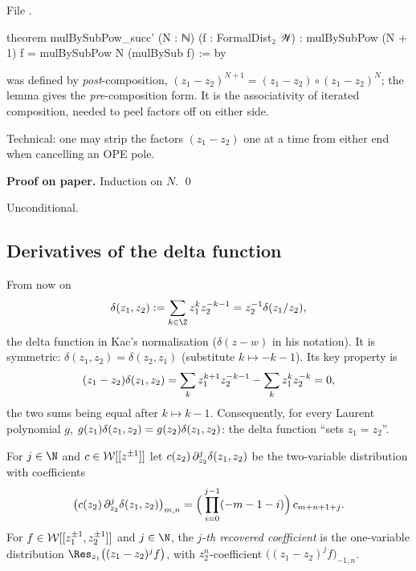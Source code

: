 \noindent File .
\begin{leancode}
theorem mulBySubPow_succ' (N : ℕ) (f : FormalDist₂ 𝒲) :
    mulBySubPow (N + 1) f = mulBySubPow N (mulBySub f) := by
\end{leancode}

\begin{dictionary}
 was defined by \emph{post}-composition, $(z_1-z_2)^{N+1} = (z_1-z_2)\circ(z_1-z_2)^N$; the
lemma gives the \emph{pre}-composition form. It is the associativity of iterated composition, needed to
peel factors off on either side.
\end{dictionary}

\begin{physics}
Technical: one may strip the factors $(z_1-z_2)$ one at a time from either end when cancelling an OPE
pole.
\end{physics}

\textbf{Proof on paper.} Induction on $N$. \qed

\begin{status}
Unconditional.
\end{status}

\subsection{Derivatives of the delta function}

From now on
\begin{equation*}
  \lonedelta := \sum_{k\in\Z}z_1^{k}z_2^{-k-1} = z_2^{-1}\delta(z_1/z_2),
\end{equation*}
the delta function in Kac's normalisation ($\delta(z-w)$ in his notation). It is symmetric:
$\delta(z_1,z_2) = \delta(z_2,z_1)$ (substitute $k\mapsto -k-1$). Its key property is
\begin{equation*}
  (z_1-z_2)\delta(z_1,z_2) = \sum_kz_1^{k+1}z_2^{-k-1}-\sum_kz_1^{k}z_2^{-k} = 0,
\end{equation*}
the two sums being equal after $k\mapsto k-1$. Consequently, for every Laurent polynomial $g$,
$g(z_1)\delta(z_1,z_2) = g(z_2)\delta(z_1,z_2)$: the delta function ``sets $z_1 = z_2$''.

\begin{definition}\label{l01:def:deltaderiv}
For $j\in\N$ and $c\in\mathcal{W}[[z^{\pm1}]]$ let $c(z_2)\,\partial_{z_2}^j\delta(z_1,z_2)$ be the two-variable distribution
with coefficients
\begin{equation*}
  \big(c(z_2)\,\partial_{z_2}^j\delta(z_1,z_2)\big)_{m,n} = \Big(\prod_{i=0}^{j-1}(-m-1-i)\Big)\,c_{m+n+1+j}.
\end{equation*}
For $f\in\mathcal{W}[[z_1^{\pm1},z_2^{\pm1}]]$ and $j\in\N$, the \emph{$j$-th recovered coefficient} is the
one-variable distribution $\Res_{z_1}\big((z_1-z_2)^jf\big)$, with $z_2^n$-coefficient
$\big((z_1-z_2)^jf\big)_{-1,n}$.
\end{definition}

